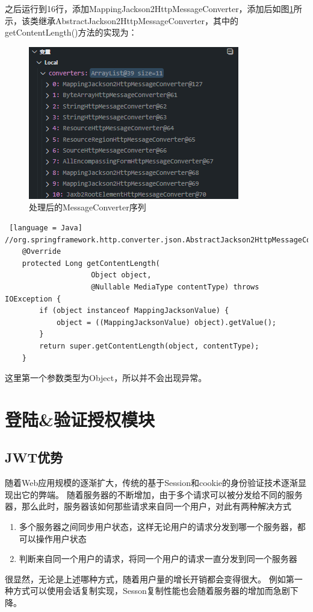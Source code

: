 之后运行到16行，添加MappingJackson2HttpMessageConverter，添加后如图\ref{MessageConverter-list-after-add}所示，该类继承AbstractJackson2HttpMessageConverter，其中的getContentLength()方法的实现为：

\begin{figure}[htbp]
  \centering
  \includegraphics[scale = 0.8]{out/figure/统一返回对象/WebMvcConfiguration-MessageConverter-debug-after-add.png}
  \caption{\song\wuhao 处理后的MessageConverter序列}
  \label{MessageConverter-list-after-add}
\end{figure}

\begin{lstlisting} [language = Java]
//org.springframework.http.converter.json.AbstractJackson2HttpMessageConverter;
	@Override
	protected Long getContentLength(
                    Object object, 
                    @Nullable MediaType contentType) throws IOException {
		if (object instanceof MappingJacksonValue) {
			object = ((MappingJacksonValue) object).getValue();
		}
		return super.getContentLength(object, contentType);
	}
\end{lstlisting}

这里第一个参数类型为Object，所以并不会出现异常。

\section{登陆\&验证授权模块}

\subsection{JWT优势}

随着Web应用规模的逐渐扩大，传统的基于Session和cookie的身份验证技术逐渐显现出它的弊端。
随着服务器的不断增加，由于多个请求可以被分发给不同的服务器，那么此时，服务器该如何那些请求来自同一个用户，对此有两种解决方式
\begin{enumerate}
  \item 多个服务器之间同步用户状态，这样无论用户的请求分发到哪一个服务器，都可以操作用户状态
  \item 判断来自同一个用户的请求，将同一个用户的请求一直分发到同一个服务器
\end{enumerate}
很显然，无论是上述哪种方式，随着用户量的增长开销都会变得很大。
例如第一种方式可以使用会话复制实现，Sesson复制性能也会随着服务器的增加而急剧下降。\cite{.2019h}

